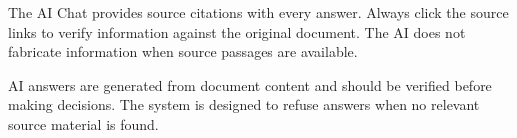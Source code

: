 \begin{ugTip}
  The AI Chat provides source citations with every answer.
  Always click the source links to verify information
  against the original document. The AI does not fabricate
  information when source passages are available.
\end{ugTip}

\begin{ugWarning}
  AI answers are generated from document content and should
  be verified before making decisions. The system is designed
  to refuse answers when no relevant source material is found.
\end{ugWarning}

\newpage
